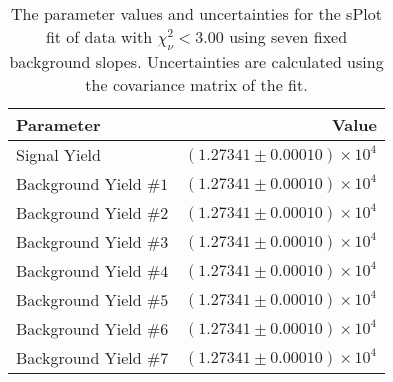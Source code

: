 
\begin{table}[ht]
    \begin{center}
        \begin{tabular}{lr}\toprule
            Parameter & Value \\\midrule
            Signal Yield & $(1.27341 \pm 0.00010) \times 10^{4}$ \\
            Background Yield $\#1$ & $(1.27341 \pm 0.00010) \times 10^{4}$ \\
            Background Yield $\#2$ & $(1.27341 \pm 0.00010) \times 10^{4}$ \\
            Background Yield $\#3$ & $(1.27341 \pm 0.00010) \times 10^{4}$ \\
            Background Yield $\#4$ & $(1.27341 \pm 0.00010) \times 10^{4}$ \\
            Background Yield $\#5$ & $(1.27341 \pm 0.00010) \times 10^{4}$ \\
            Background Yield $\#6$ & $(1.27341 \pm 0.00010) \times 10^{4}$ \\
            Background Yield $\#7$ & $(1.27341 \pm 0.00010) \times 10^{4}$ \\\bottomrule
        \end{tabular}
        \caption{The parameter values and uncertainties for the sPlot fit of data with $\chi^2_\nu < 3.00$ using seven fixed background slopes. Uncertainties are calculated using the covariance matrix of the fit.}\label{tab:splot-fit-results-chisqdof-3.00-fixed-7}
    \end{center}
\end{table}
